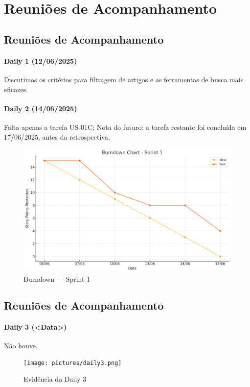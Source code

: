 \section{Reuniões de Acompanhamento}

\subsection{Reuniões de Acompanhamento}

\paragraph{Daily 1 (12/06/2025)} Discutimos os critérios para filtragem de artigos e as ferramentas de busca mais eficazes.

\paragraph{Daily 2 (14/06/2025)} Falta apenas a tarefa US-01C; Nota do futuro: a tarefa restante foi concluída em 17/06/2025, antes da retrospectiva.

\begin{figure}[htbp]
  \centering
  \includegraphics[width=0.7\linewidth]{pictures/burndown_sprint1.png}
  \caption{Burndown — Sprint 1}
\end{figure}

\subsection{Reuniões de Acompanhamento}

\paragraph{Daily 3 (\textless Data\textgreater)} Não houve.

\begin{figure}[htbp]
  \centering
  \texttt{[image: pictures/daily3.png]}
  \caption{Evidência da Daily 3}
\end{figure}

